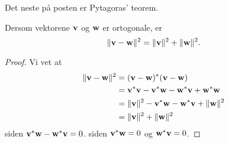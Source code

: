  Det neste på posten er Pytagoras' teorem. 

\begin{thm}
Dersom vektorene $\mathbf{v}$ og $\mathbf{w}$ er ortogonale, er
\[
\|\mathbf{v}-\mathbf{w}\|^2=\|\mathbf{v}\|^2+\|\mathbf{w}\|^2.
\]
\end{thm}

\begin{proof}
Vi vet at 
\begin{align*}
\|\mathbf{v}-\mathbf{w} \|^2&=(\mathbf{v}-\mathbf{w})^*(\mathbf{v}-\mathbf{w})\\&=\mathbf{v}^*\mathbf{v}-\mathbf{v}^*\mathbf{w}-\mathbf{w}^*\mathbf{v}+\mathbf{w}^*\mathbf{w}\\ & =\|\mathbf{v}\|^2 -\mathbf{v}^*\mathbf{w}-\mathbf{w}^*\mathbf{v}+\|\mathbf{w}\|^2\\ &=\|\mathbf{v}\|^2 +\|\mathbf{w}\|^2
\end{align*}
siden $\mathbf{v}^*\mathbf{w}-\mathbf{w}^*\mathbf{v}=0$.
siden $\mathbf{v}^* \mathbf{w} = 0$ og $\mathbf{w}^* \mathbf{v} = 0$.
\end{proof}

